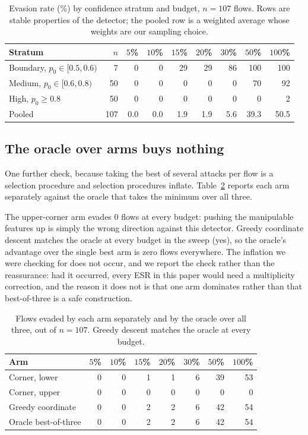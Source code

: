 \documentclass[journal]{IEEEtran}
\theoremstyle{definition}
\newcommand{\CNsweep}{107}
\newcommand{\XArmHiNever}{0}
\newcommand{\XGreedyEqBest}{yes}
\begin{document}
\begin{table}[t]
\caption{Evasion rate (\%) by confidence stratum and budget, $n=\CNsweep$
flows. Rows are stable properties of the detector; the pooled row is a weighted
average whose weights are our sampling choice.}
\label{tab:stratumesr}
\centering
\footnotesize
\setlength{\tabcolsep}{6pt}
\begin{tabular}{@{}lrrrrrrrr@{}}
\toprule
Stratum & $n$ & $5$\% & $10$\% & $15$\% & $20$\% & $30$\% & $50$\% & $100$\% \\
\midrule
Boundary, $p_0 \in [0.5, 0.6)$ & 7 & 0 & 0 & 29 & 29 & 86 & 100 & 100 \\
Medium, $p_0 \in [0.6, 0.8)$ & 50 & 0 & 0 & 0 & 0 & 0 & 70 & 92 \\
High, $p_0 \ge 0.8$ & 50 & 0 & 0 & 0 & 0 & 0 & 0 & 2 \\
\midrule
Pooled & 107 & 0.0 & 0.0 & 1.9 & 1.9 & 5.6 & 39.3 & 50.5 \\
\bottomrule
\end{tabular}
\end{table}

\subsection{The oracle over arms buys nothing}
\label{sec:oracle}

One further check, because taking the best of several attacks per flow is a
selection procedure and selection procedures inflate. Table~\ref{tab:armeps}
reports each arm separately against the oracle that takes the minimum over all
three.

The upper-corner arm evades \XArmHiNever{} flows at every budget: pushing the
manipulable features up is simply the wrong direction against this detector.
Greedy coordinate descent matches the oracle at every budget in the sweep
(\XGreedyEqBest), so the oracle's advantage over the single best arm is zero
flows everywhere. The inflation we were checking for does not occur, and we
report the check rather than the reassurance: had it occurred, every ESR in this
paper would need a multiplicity correction, and the reason it does not is that
one arm dominates rather than that best-of-three is a safe construction.

\begin{table}[t]
\caption{Flows evaded by each arm separately and by the oracle over all three,
out of $n=\CNsweep$. Greedy descent matches the oracle at every budget.}
\label{tab:armeps}
\centering
\footnotesize
\setlength{\tabcolsep}{4pt}
\begin{tabular}{@{}lrrrrrrr@{}}
\toprule
Arm & $5$\% & $10$\% & $15$\% & $20$\% & $30$\% & $50$\% & $100$\% \\
\midrule
Corner, lower & 0 & 0 & 1 & 1 & 6 & 39 & 53 \\
Corner, upper & 0 & 0 & 0 & 0 & 0 & 0 & 0 \\
Greedy coordinate & 0 & 0 & 2 & 2 & 6 & 42 & 54 \\
Oracle best-of-three & 0 & 0 & 2 & 2 & 6 & 42 & 54 \\
\bottomrule
\end{tabular}
\end{table}
\end{document}
